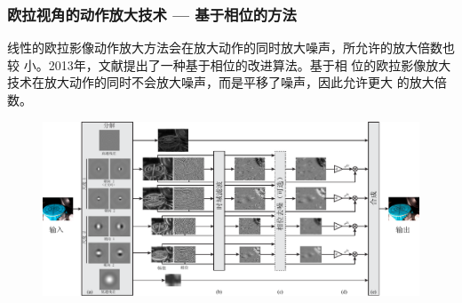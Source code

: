 \documentclass[xcolor=svgnames,serif,table]{beamer}
\begin{document}
\begin{frame}
  \frametitle{欧拉视角的动作放大技术 --- 基于相位的方法}
  \small
  
  线性的欧拉影像动作放大方法会在放大动作的同时放大噪声，所允许的放大倍数也较
  小。2013年，文献\cite{Wadhwa2013PhaseBased}提出了一种基于相位的改进算法。基于相
  位的欧拉影像放大技术在放大动作的同时不会放大噪声，而是平移了噪声，因此允许更大
  的放大倍数。

  \begin{figure}[htbp]
  \centering
  \includegraphics[width=.9\textwidth]{phase.pdf}
  \label{fig:phase-based}
  \end{figure}
\end{frame}


\end{document}
